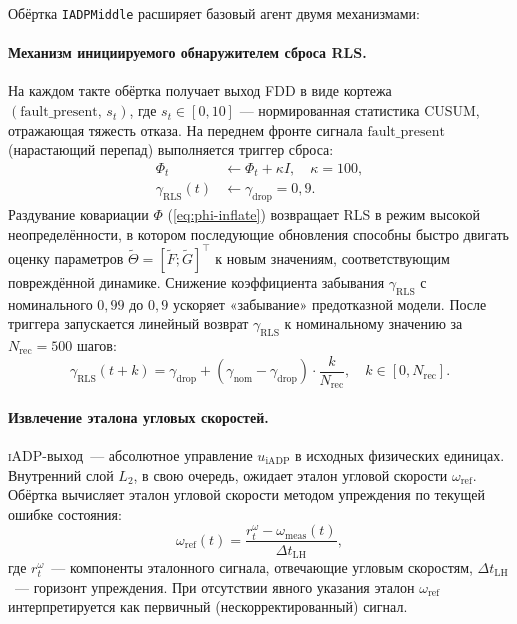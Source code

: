 \documentclass[a4paper,14pt]{extarticle}
\newcommand{\IADP}{\textsc{iADP}}
\newcommand{\FDD}{\textsc{FDD}}
\newcommand{\CUSUM}{\textsc{CUSUM}}
\newcommand{\RLS}{\textsc{RLS}}
\begin{document}
Обёртка \texttt{IADPMiddle} расширяет базовый агент двумя механизмами:

\paragraph{Механизм инициируемого обнаружителем сброса \RLS{}.} На каждом такте обёртка получает выход \FDD{} в виде кортежа $(\text{fault\_present},\,s_t)$, где $s_t\in[0,10]$ — нормированная статистика \CUSUM{}, отражающая тяжесть отказа. На переднем фронте сигнала $\text{fault\_present}$ (нарастающий перепад) выполняется триггер сброса:
\begin{align}
\Phi_t  &\leftarrow \Phi_t + \kappa I, \quad \kappa = 100, \label{eq:phi-inflate}\\
\gamma_{\text{RLS}}(t) &\leftarrow \gamma_{\text{drop}} = 0{,}9. \label{eq:gamma-drop}
\end{align}
Раздувание ковариации $\Phi$ (\ref{eq:phi-inflate}) возвращает \RLS{} в режим высокой неопределённости, в котором последующие обновления способны быстро двигать оценку параметров $\tilde\Theta = [\tilde F;\tilde G]^\top$ к новым значениям, соответствующим повреждённой динамике. Снижение коэффициента забывания $\gamma_{\text{RLS}}$ с номинального $0{,}99$ до $0{,}9$ ускоряет «забывание» предотказной модели. После триггера запускается линейный возврат $\gamma_{\text{RLS}}$ к номинальному значению за $N_{\text{rec}} = 500$ шагов:
\begin{equation}
\gamma_{\text{RLS}}(t+k) = \gamma_{\text{drop}} + (\gamma_{\text{nom}} - \gamma_{\text{drop}}) \cdot \frac{k}{N_{\text{rec}}}, \quad k\in[0,N_{\text{rec}}].
\label{eq:gamma-recover}
\end{equation}

\paragraph{Извлечение эталона угловых скоростей.} \IADP{}-выход~--- абсолютное управление $u_{\text{iADP}}$ в исходных физических единицах. Внутренний слой $L_2$, в свою очередь, ожидает эталон угловой скорости $\omega_{\text{ref}}$. Обёртка вычисляет эталон угловой скорости методом упреждения по текущей ошибке состояния:
\begin{equation}
\omega_{\text{ref}}(t) = \frac{r_t^{\omega} - \omega_{\text{meas}}(t)}{\Delta t_{\text{LH}}},
\label{eq:omega-ref}
\end{equation}
где $r_t^{\omega}$~--- компоненты эталонного сигнала, отвечающие угловым скоростям, $\Delta t_{\text{LH}}$~--- горизонт упреждения. При отсутствии явного указания эталон $\omega_{\text{ref}}$ интерпретируется как первичный (нескорректированный) сигнал.
\end{document}

